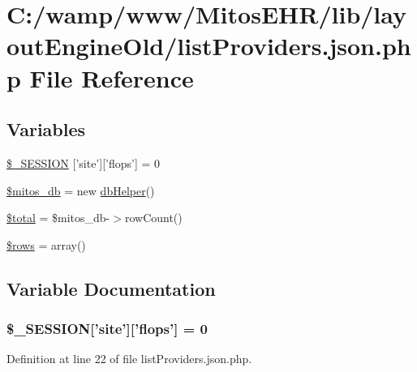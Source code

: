 \hypertarget{list_providers_8json_8php}{\section{\-C\-:/wamp/www/\-Mitos\-E\-H\-R/lib/layout\-Engine\-Old/list\-Providers.json.\-php \-File \-Reference}
\label{list_providers_8json_8php}
}
\subsection*{\-Variables}
\begin{DoxyCompactItemize}
\item 
\hyperlink{list_providers_8json_8php_a99fda8552a3e58235643b79f5af3ded8}{\$\-\_\-\-S\-E\-S\-S\-I\-O\-N} \mbox{[}'site'\mbox{]}\mbox{[}'flops'\mbox{]} = 0
\item 
\hyperlink{list_providers_8json_8php_ab5d961f93efe4e2e8d8374f01dd6c65a}{\$mitos\-\_\-db} = new \hyperlink{classdb_helper}{db\-Helper}()
\item 
\hyperlink{list_providers_8json_8php_a241b818f48030b628685b2e5119c5624}{\$total} = \$mitos\-\_\-db-\/$>$row\-Count()
\item 
\hyperlink{list_providers_8json_8php_ace2ec39e7df3899fa8df9640ec274b03}{\$rows} = array()
\end{DoxyCompactItemize}


\subsection{\-Variable \-Documentation}
\hypertarget{list_providers_8json_8php_a99fda8552a3e58235643b79f5af3ded8}{
\subsubsection[{\$\-\_\-\-S\-E\-S\-S\-I\-O\-N}]{\setlength{\rightskip}{0pt plus 5cm}\$\-\_\-\-S\-E\-S\-S\-I\-O\-N\mbox{[}'site'\mbox{]}\mbox{[}'flops'\mbox{]} = 0}}\label{list_providers_8json_8php_a99fda8552a3e58235643b79f5af3ded8}


\-Definition at line 22 of file list\-Providers.\-json.\-php.

